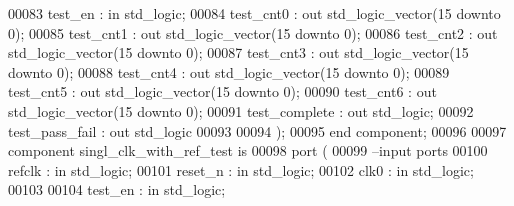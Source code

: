 \begin{DoxyCode}
00083           test_en           : \textcolor{keywordflow}{in} \textcolor{comment}{std\_logic};
00084           test_cnt0         : \textcolor{keywordflow}{out} \textcolor{comment}{std\_logic\_vector}(\textcolor{vhdllogic}{}\textcolor{vhdllogic}{15} \textcolor{keywordflow}{downto} \textcolor{vhdllogic}{}\textcolor{vhdllogic}{0});
00085           test_cnt1         : \textcolor{keywordflow}{out} \textcolor{comment}{std\_logic\_vector}(\textcolor{vhdllogic}{}\textcolor{vhdllogic}{15} \textcolor{keywordflow}{downto} \textcolor{vhdllogic}{}\textcolor{vhdllogic}{0});
00086           test_cnt2         : \textcolor{keywordflow}{out} \textcolor{comment}{std\_logic\_vector}(\textcolor{vhdllogic}{}\textcolor{vhdllogic}{15} \textcolor{keywordflow}{downto} \textcolor{vhdllogic}{}\textcolor{vhdllogic}{0});
00087           test_cnt3         : \textcolor{keywordflow}{out} \textcolor{comment}{std\_logic\_vector}(\textcolor{vhdllogic}{}\textcolor{vhdllogic}{15} \textcolor{keywordflow}{downto} \textcolor{vhdllogic}{}\textcolor{vhdllogic}{0});
00088           test_cnt4         : \textcolor{keywordflow}{out} \textcolor{comment}{std\_logic\_vector}(\textcolor{vhdllogic}{}\textcolor{vhdllogic}{15} \textcolor{keywordflow}{downto} \textcolor{vhdllogic}{}\textcolor{vhdllogic}{0});
00089           test_cnt5         : \textcolor{keywordflow}{out} \textcolor{comment}{std\_logic\_vector}(\textcolor{vhdllogic}{}\textcolor{vhdllogic}{15} \textcolor{keywordflow}{downto} \textcolor{vhdllogic}{}\textcolor{vhdllogic}{0});
00090           test_cnt6         : \textcolor{keywordflow}{out} \textcolor{comment}{std\_logic\_vector}(\textcolor{vhdllogic}{}\textcolor{vhdllogic}{15} \textcolor{keywordflow}{downto} \textcolor{vhdllogic}{}\textcolor{vhdllogic}{0});
00091           test_complete : \textcolor{keywordflow}{out} \textcolor{comment}{std\_logic};
00092           test_pass_fail    : \textcolor{keywordflow}{out} \textcolor{comment}{std\_logic}
00093      
00094         );
00095 \textcolor{keywordflow}{end} \textcolor{keywordflow}{component};
00096 
00097 \textcolor{keywordflow}{component} singl_clk_with_ref_test \textcolor{keywordflow}{is}
00098   \textcolor{keywordflow}{port} (
00099 \textcolor{keyword}{        --input ports }
00100         refclk          : \textcolor{keywordflow}{in} \textcolor{comment}{std\_logic};
00101         reset_n         : \textcolor{keywordflow}{in} \textcolor{comment}{std\_logic};
00102           clk0              : \textcolor{keywordflow}{in} \textcolor{comment}{std\_logic};
00103           
00104           test_en           : \textcolor{keywordflow}{in} \textcolor{comment}{std\_logic};

\end{DoxyCode}

